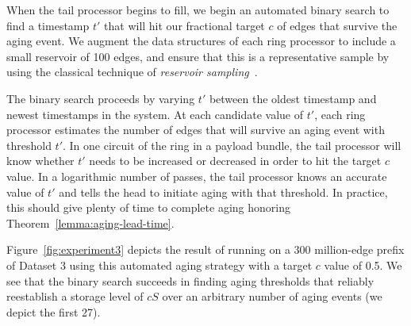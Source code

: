 When the tail processor begins to fill, we begin an automated binary
search to find a timestamp $t'$ that will hit our fractional target $c$
of edges that survive the aging event.  We augment the
data structures of each \XStream ring processor to include a small
reservoir of 100 edges, and ensure that this is a representative
sample by using the classical technique
of \emph{reservoir sampling}~\cite{vitter1985random}.  

The binary search proceeds by varying $t'$ between the oldest timestamp
and newest timestamps in the system.  At 
each candidate value of $t'$, each ring processor estimates
the number of edges that will survive an aging event with threshold $t'$.
In one circuit of the ring in a payload bundle, the tail processor will
know whether $t'$ needs to be increased or decreased in order to hit
the target $c$ value.  In a logarithmic number of passes, the tail
processor knows an accurate value of $t'$ and tells the head to initiate
aging with that threshold.  In practice, this should give plenty of
time to complete aging honoring Theorem~\ref{lemma:aging-lead-time}.

Figure~\ref{fig:experiment3} depicts the result of running \XSCC on 
a 300 million-edge prefix of Dataset 3 using this automated aging
strategy with a target $c$ value of 0.5.  We see that the binary 
search succeeds in finding aging thresholds that reliably 
reestablish a storage level of $cS$ over an arbitrary number of
aging events (we depict the first 27).


%

